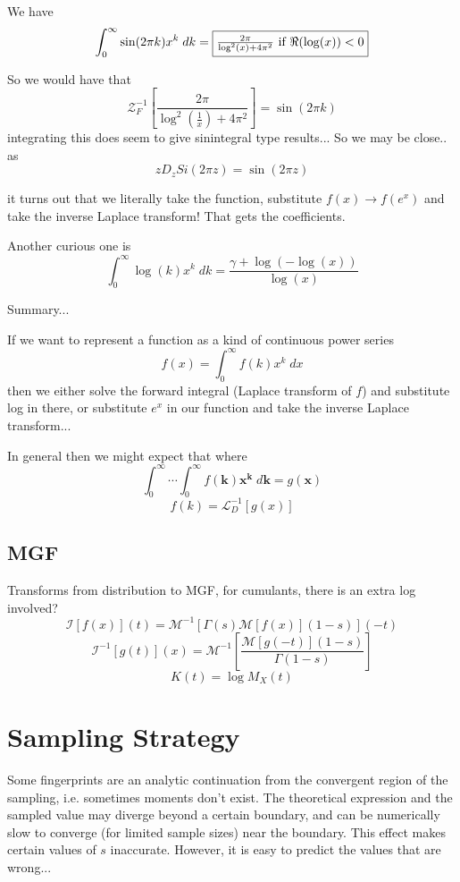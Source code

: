 \documentclass{article}
\begin{document}
We have 
$$
\int_0^\infty \sin(2 \pi k) x^k \; dk = \fbox{$\frac{2 \pi }{\log ^2(x)+4 \pi ^2}\text{ if }\Re(\log (x))<0$}
$$

So we would have that 
$$
\mathcal{Z}^{-1}_F \left[ \frac{2 \pi}{\log^2(\frac{1}{x}) + 4 \pi^2}\right] = \sin(2 \pi k)
$$
integrating this does seem to give sinintegral type results... So we may be close.. as 
$$
z D_z Si(2 \pi z) = \sin(2 \pi z)
$$

it turns out that we literally take the function, substitute $f(x) \to f(e^x)$ and take the inverse Laplace transform! That gets the coefficients.



Another curious one is 
$$
\int_0^\infty \log(k) x^k \; dk = \frac{\gamma + \log(-\log(x))}{\log(x)}
$$


Summary...

If we want to represent a function as a kind of continuous power series
$$
f(x) = \int_0^\infty f(k) x^k \; dx
$$
then we either solve the forward integral (Laplace transform of $f$) and substitute log in there, or substitute $e^x$ in our function and take the inverse Laplace transform... 

In general then we might expect that where
$$
\int_0^\infty \cdots \int_0^\infty f(\mathbf{k}) \mathbf{x^k} \; d \mathbf{k} = g(\mathbf{x})
$$
$$
f(k) = \mathcal{L}_D^{-1}[g(x)]
$$






\subsection{MGF}
Transforms from distribution to MGF, for cumulants, there is an extra log involved?
$$
\mathcal{I}[f(x)](t) = \mathcal{M}^{-1}[\Gamma(s) \mathcal{M}[f(x)](1-s)](-t)
$$
$$
\mathcal{I}^{-1}[g(t)](x) = \mathcal{M}^{-1}\left[ \frac{\mathcal{M}[g(-t)](1-s)}{\Gamma(1-s)}\right]
$$
$$
K(t) = \log M_X(t)
$$


\section{Sampling Strategy}
Some fingerprints are an analytic continuation from the convergent region of the sampling, i.e. sometimes moments don't exist. The theoretical expression and the sampled value may diverge beyond a certain boundary, and can be numerically slow to  converge (for limited sample sizes) near the boundary. This effect makes certain values of $s$ inaccurate. However, it is easy to predict the values that are wrong... 
\end{document}
